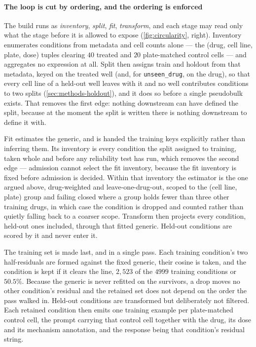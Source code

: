 \paragraph{The loop is cut by ordering, and the ordering is enforced} The build runs
as \emph{inventory}, \emph{split}, \emph{fit}, \emph{transform}, and each stage may
read only what the stage before it is allowed to expose (\cref{fig:circularity},
right). Inventory enumerates conditions from metadata and cell counts alone --- the
(drug, cell line, plate, dose) tuples clearing $40$ treated and $20$ plate-matched
control cells --- and aggregates no expression at all. Split then assigns train and
holdout from that metadata, keyed on the treated well (and, for \texttt{unseen\_drug}, on the drug), so that every cell line of a held-out well leaves with it and no well contributes conditions to two splits (\cref{sec:methods-holdout}), and it does so before a single
pseudobulk exists. That removes the first edge: nothing downstream can have defined
the split, because at the moment the split is written there is nothing downstream to
define it with.

Fit estimates the generic, and is handed the training keys explicitly rather than
inferring them. Its inventory is every condition the split assigned to training,
taken whole and before any reliability test has run, which removes the second edge
--- admission cannot select the fit inventory, because the fit inventory is fixed
before admission is decided. Within that inventory the estimator is the one argued
above, drug-weighted and leave-one-drug-out, scoped to the (cell line, plate) group
and failing closed where a group holds fewer than three other training drugs, in
which case the condition is dropped and counted rather than quietly falling back to
a coarser scope. Transform then projects every condition, held-out ones included,
through that fitted generic. Held-out conditions are scored by it and never enter
it.

The training set is made last, and in a single pass. Each training condition's two
half-residuals are formed against the fixed generic, their cosine is taken, and the
condition is kept if it clears the line, $2{,}523$ of the $\num{4999}$ training
conditions or $50.5\%$. Because the generic is never refitted on the survivors, a
drop moves no other condition's residual and the retained set does not depend on the
order the pass walked in. Held-out conditions are transformed but deliberately not
filtered. Each retained condition then emits one training example per plate-matched
control cell, the prompt carrying that control cell together with the drug, its dose
and its mechanism annotation, and the response being that condition's residual
string.

